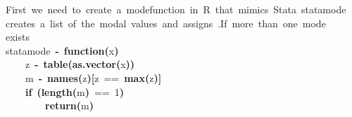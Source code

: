 \documentclass[12pt]{article}
\makeatletter
\newcommand{\hlnumber}[1]{\textcolor[rgb]{0,0,0}{#1}}%
\newcommand{\hlfunctioncall}[1]{\textcolor[rgb]{0.501960784313725,0,0.329411764705882}{\textbf{#1}}}%
\newcommand{\hlkeyword}[1]{\textcolor[rgb]{0,0,0}{\textbf{#1}}}%
\newcommand{\hlcomment}[1]{\textcolor[rgb]{0.180392156862745,0.6,0.341176470588235}{#1}}%
\newcommand{\hlformalargs}[1]{\textcolor[rgb]{0.690196078431373,0.250980392156863,0.0196078431372549}{#1}}%
\newcommand{\hlassignement}[1]{\textcolor[rgb]{0,0,0}{\textbf{#1}}}%
\newcommand{\hlsymbol}[1]{\textcolor[rgb]{0,0,0}{#1}}%
\newcommand{\hlstd}[1]{\textcolor[rgb]{0,0,0}{#1}}%
\newenvironment{kframe}{%
 \def\FrameCommand##1{\hskip\@totalleftmargin \hskip-\fboxsep
 \colorbox{shadecolor}{##1}\hskip-\fboxsep
     \hskip-\linewidth \hskip-\@totalleftmargin \hskip\columnwidth}%
 \MakeFramed {\advance\hsize-\width
   \@totalleftmargin\z@ \linewidth\hsize
   \@setminipage}}%
 {\par\unskip\endMakeFramed}
\newenvironment{knitrout}{}{} %
\renewenvironment{knitrout}{\begin{footnotesize}}{\end{footnotesize}}
\makeatother
\begin{document}
\begin{knitrout}
\color{fgcolor}\begin{kframe}
\begin{flushleft}
\ttfamily\noindent
\hlcomment{\usebox{\hlnormalsizeboxhash}{\ }First{\ }we{\ }need{\ }to{\ }create{\ }a{\ }\usebox{\hlnormalsizeboxsinglequote}mode\usebox{\hlnormalsizeboxsinglequote}{\ }function{\ }in{\ }R{\ }that{\ }mimics{\ }Stata{\ }statamode}\hspace*{\fill}\\
\hlstd{}\hlcomment{\usebox{\hlnormalsizeboxhash}{\ }creates{\ }a{\ }list{\ }of{\ }the{\ }modal{\ }values{\ }and{\ }assigns{\ }\usebox{\hlnormalsizeboxsinglequote}.\usebox{\hlnormalsizeboxsinglequote}{\ }{\ }If{\ }more{\ }than{\ }one{\ }mode}\hspace*{\fill}\\
\hlstd{}\hlcomment{\usebox{\hlnormalsizeboxhash}{\ }exists}\hspace*{\fill}\\
\hlstd{}\hlsymbol{statamode}{\ }\hlassignement{\usebox{\hlnormalsizeboxlessthan}-}{\ }\hlkeyword{function}\hlkeyword{(}\hlformalargs{x}\hlkeyword{)}{\ }\hlkeyword{\usebox{\hlnormalsizeboxopenbrace}}\hspace*{\fill}\\
\hlstd{}{\ }{\ }{\ }{\ }\hlsymbol{z}{\ }\hlassignement{\usebox{\hlnormalsizeboxlessthan}-}{\ }\hlfunctioncall{table}\hlkeyword{(}\hlfunctioncall{as.vector}\hlkeyword{(}\hlsymbol{x}\hlkeyword{)}\hlkeyword{)}\hspace*{\fill}\\
\hlstd{}{\ }{\ }{\ }{\ }\hlsymbol{m}{\ }\hlassignement{\usebox{\hlnormalsizeboxlessthan}-}{\ }\hlfunctioncall{names}\hlkeyword{(}\hlsymbol{z}\hlkeyword{)}\hlkeyword{[}\hlsymbol{z}{\ }=={\ }\hlfunctioncall{max}\hlkeyword{(}\hlsymbol{z}\hlkeyword{)}\hlkeyword{]}\hspace*{\fill}\\
\hlstd{}{\ }{\ }{\ }{\ }\hlkeyword{if}{\ }\hlkeyword{(}\hlfunctioncall{length}\hlkeyword{(}\hlsymbol{m}\hlkeyword{)}{\ }=={\ }\hlnumber{1}\hlkeyword{)}{\ }\hlkeyword{\usebox{\hlnormalsizeboxopenbrace}}\hspace*{\fill}\\
\hlstd{}{\ }{\ }{\ }{\ }{\ }{\ }{\ }{\ }\hlfunctioncall{return}\hlkeyword{(}\hlsymbol{m}\hlkeyword{)}\hspace*{\fill}\\
\hlstd{}{\ }{\ }{\ }{\ }\hlkeyword{\usebox{\hlnormalsizeboxclosebrace}}\hspace*{\fill}\\

\end{flushleft}
\end{kframe}
\end{knitrout}
\end{document}
